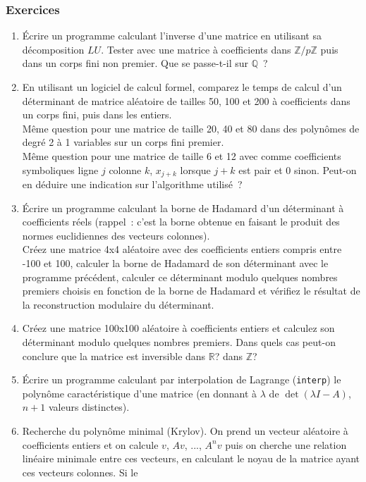 \documentclass[a4paper,11pt]{article}
\begin{document}
\begin{giacjshere}
\subsubsection{Exercices}
\begin{enumerate}
\item \'Ecrire un programme calculant l'inverse d'une matrice
en utilisant sa d\'ecomposition $LU$. Tester avec une matrice
\`a coefficients dans $\mathbb{Z}/p\mathbb{Z}$ puis dans un corps fini non premier.
Que se passe-t-il sur $\mathbb{Q}$~?
\item En utilisant un logiciel de calcul formel,
comparez le temps de calcul d'un d\'eterminant de matrice
al\'eatoire de tailles 50, 100 et 200 \`a coefficients dans
un corps fini, puis dans les entiers. \\
M\^eme
question pour une matrice de taille 20, 40 et 80
dans des polyn\^omes de degr\'e 2
\`a 1 variables sur un corps fini premier.\\
M\^eme question pour 
une matrice de taille 6 et 12 avec comme coefficients symboliques
ligne $j$ colonne $k$, $x_{j+k}$ lorsque $j+k$ est pair
et 0 sinon. Peut-on en déduire une indication sur l'algorithme
utilisé~?
\item \'Ecrire un programme calculant la borne de Hadamard d'un
déterminant à coefficients réels (rappel~: c'est la borne obtenue en faisant
le produit des normes euclidiennes des vecteurs colonnes).\\
Créez une matrice 4x4 aléatoire avec des coefficients entiers
compris entre -100 et 100, calculer la borne de Hadamard de son déterminant
avec le programme précédent, calculer ce déterminant modulo
quelques nombres premiers choisis en fonction de la borne de Hadamard
et vérifiez le résultat de la reconstruction modulaire du déterminant.
\item Créez une matrice 100x100 aléatoire à coefficients entiers
et calculez son déterminant
modulo quelques nombres premiers. Dans quels cas peut-on
conclure que la matrice est inversible dans $\mathbb{R}$? dans $\mathbb{Z}$?
\item \'Ecrire un programme calculant par interpolation de Lagrange 
(\verb|interp|)
le polyn\^ome caract\'eristique d'une matrice (en donnant \`a $\lambda$
de $\det(\lambda I -A)$, $n+1$ valeurs distinctes).
\item Recherche du polynôme minimal (Krylov). On prend un vecteur aléatoire
à coefficients entiers et on calcule $v$, $Av$, ..., $A^nv$ puis
on cherche une relation linéaire minimale entre ces vecteurs, en
calculant le noyau de la matrice ayant ces vecteurs colonnes. Si le

\end{enumerate}
\end{giacjshere}
\end{document}
